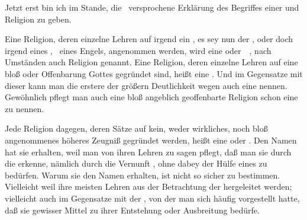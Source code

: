 Jetzt erst bin ich im Stande, die \ versprochene Erklärung des Begriffes einer  und  Religion zu geben.
\begin{aufza}
\item Eine Religion, deren einzelne Lehren auf irgend ein , es sey nun der , oder doch irgend eines , \zB\ eines Engels, angenommen werden, wird eine  oder~\ , nach Umständen auch  Religion genannt. Eine Religion, deren einzelne Lehren auf eine bloß  oder  Offenbarung Gottes gegründet sind, heißt eine . Und im Gegensatze mit dieser kann man die erstere der größern Deutlichkeit wegen auch eine  nennen. Gewöhnlich pflegt man auch eine bloß angeblich geoffenbarte Religion schon eine  zu nennen.
\item Jede Religion dagegen, deren Sätze auf kein, weder wirkliches, noch bloß angenommenes höheres Zeugniß gegründet werden, heißt eine  oder . Den Namen  hat sie erhalten, weil man von ihren Lehren zu sagen pflegt, daß man sie durch die  erkenne, nämlich durch die Vernunft , ohne dabey der Hülfe eines  zu bedürfen. Warum sie den Namen  erhalten, ist nicht so sicher zu bestimmen. Vielleicht weil ihre meisten Lehren aus der Betrachtung der  hergeleitet werden; vielleicht auch im Gegensatze mit der , von der man sich häufig vorgestellt hatte, daß sie gewisser  Mittel zu ihrer Entstehung oder Ausbreitung bedürfe.
\end{aufza}

